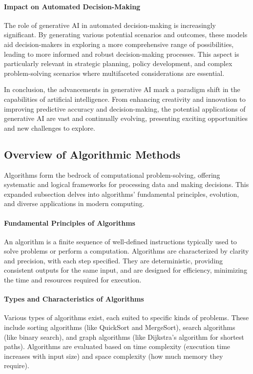\documentclass{article}
\begin{document}
\paragraph{Impact on Automated Decision-Making}
The role of generative AI in automated decision-making is increasingly significant. By generating various potential scenarios and outcomes, these models aid decision-makers in exploring a more comprehensive range of possibilities, leading to more informed and robust decision-making processes. This aspect is particularly relevant in strategic planning, policy development, and complex problem-solving scenarios where multifaceted considerations are essential.

In conclusion, the advancements in generative AI mark a paradigm shift in the capabilities of artificial intelligence. From enhancing creativity and innovation to improving predictive accuracy and decision-making, the potential applications of generative AI are vast and continually evolving, presenting exciting opportunities and new challenges to explore.


\subsection{Overview of Algorithmic Methods}

Algorithms form the bedrock of computational problem-solving, offering systematic and logical frameworks for processing data and making decisions. This expanded subsection delves into algorithms' fundamental principles, evolution, and diverse applications in modern computing.

\paragraph{Fundamental Principles of Algorithms}
An algorithm is a finite sequence of well-defined instructions typically used to solve problems or perform a computation. Algorithms are characterized by clarity and precision, with each step specified. They are deterministic, providing consistent outputs for the same input, and are designed for efficiency, minimizing the time and resources required for execution.

\paragraph{Types and Characteristics of Algorithms}
Various types of algorithms exist, each suited to specific kinds of problems. These include sorting algorithms (like QuickSort and MergeSort), search algorithms (like binary search), and graph algorithms (like Dijkstra's algorithm for shortest paths). Algorithms are evaluated based on time complexity (execution time increases with input size) and space complexity (how much memory they require).
\end{document}
